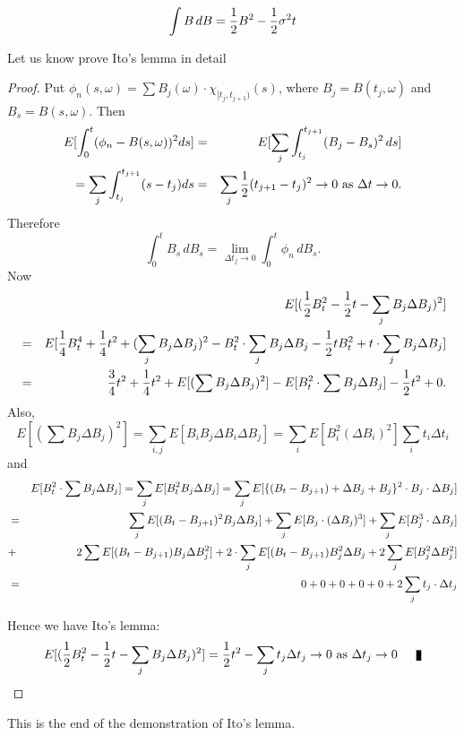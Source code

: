 $$\int B\,dB = {1\over2}B^2 - {1\over2} \sigma^2 t$$

Let us know prove Ito's lemma in detail
\begin{proof}
Put $\phi_n(s,\omega) = \sum B_j(\omega) \cdot \chi_{[t_j, t_{j+1})}(s)$, where $B_j = B(t_j, \omega)$ and $B_s = B(s, \omega)$. Then 
\begin{eqnarray*}
E[\int_0^t(\phi_n - B(s,\omega) )^2 ds] &=& E[\sum_j \int_{t_j}^{t_{j+1}} (B_j - B_s)^2 \, ds]  \\
= \sum_j\int_{t_j}^{t_{j+1}} (s-t_j) ds  &=& \sum_j {1\over2}(t_{j+1} - t_j)^2 \rightarrow 0 \hbox{~as~} \Delta t \rightarrow 0. 
\end{eqnarray*}
Therefore $$\int_0^t B_s\, dB_s = \lim_{\Delta t_j\rightarrow 0} \int_0^t \phi_n\, dB_s.$$
Now
\begin{eqnarray*}
&\null& E[( {1\over2}B_t^2 - {1\over2}t - \sum_j B_j \Delta B_j)^2] \\
&=&E[{1\over4} B_t^4 + {1\over4}t^2 + (\sum_j B_j \Delta B_j)^2 - B_t^2\cdot \sum_j B_j\Delta B_j - {1\over2}tB_t^2 + t\cdot \sum_j B_j\Delta B_j] \\
&=& {3\over4}t^2 + {1\over4}t^2 + E[(\sum B_j \Delta B_j)^2] - E[B_t^2\cdot \sum B_j\Delta B_j] - {1\over2}t^2 + 0. 
\end{eqnarray*}
Also, $$E[(\sum B_j \Delta B_j)^2] = \sum_{i,j} E[B_iB_j\Delta B_i \Delta B_j] = \sum_iE[B_i^2(\Delta B_i)^2]  \sum_i t_i \Delta t_i$$ and
\begin{eqnarray*}
&\null&E[B_t^2\cdot \sum B_j \Delta B_j] = \sum_jE[B_t^2B_j\Delta B_j] = \sum_j E[\{(B_t - B_{j+1}) + \Delta B_j + B_j\}^2\cdot B_j\cdot \Delta B_j]\\
&=&\sum_jE[(B_t - B_{j+1})^2 B_j\Delta B_j] + \sum_j E[B_j\cdot (\Delta B_j)^3] + \sum_jE[B_j^3\cdot \Delta B_j] \\
&+& 2\sum E[(B_t - B_{j+1}) B_j\Delta B^2_j] + 2\cdot\sum_j E[(B_t-B_{j+1})B_j^2\Delta B_j + 2 \sum_j E[B_j^2\Delta B_j^2]\\
&=& 0 + 0 + 0 + 0 + 0 + 2\sum_j t_j\cdot \Delta t_j
\end{eqnarray*}

Hence we have Ito's lemma: $$E[({1\over2}B_t^2 - {1\over2}t - \sum_j B_j \Delta B_j)^2] = {1\over2}t^2 - \sum_j t_j\Delta t_j \rightarrow 0 \hbox{~as~} \Delta t_j \rightarrow 0\qed$$
\end{proof}

This is the end of the demonstration of Ito's lemma.\\

